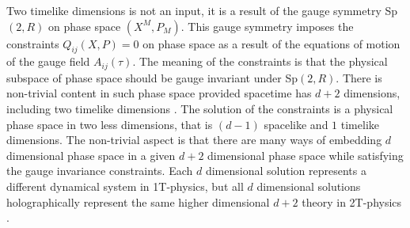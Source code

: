 \documentclass[a4paper,12pt]{article}
\begin{document}
Two timelike dimensions is not an input, it is a result of the
gauge symmetry Sp$(2,R)$ on phase space $\left( X^{M},P_{M}\right)
.$ This gauge symmetry imposes the constraints $Q_{ij}(X,P)=0$ on
phase space as a result of the equations of motion of the gauge
field $A_{ij}\left( \tau \right) $. The meaning of the constraints
is that the physical subspace of phase space should be gauge
invariant under Sp$\left( 2,R\right) .$ There is non-trivial
content in such phase space provided spacetime has $d+2$
dimensions, including two timelike dimensions \cite{old2T}. The
solution of the constraints is a physical phase space in two less
dimensions, that is $ \left( d-1\right) $ spacelike and $1$
timelike dimensions. The non-trivial aspect is that there are many
ways of embedding $d$ dimensional phase space in a given $d+2$
dimensional phase space while satisfying the gauge invariance
constraints. Each $d$ dimensional solution represents a different
dynamical system in 1T-physics, but all $d$ dimensional solutions
holographically represent the same higher dimensional $d+2$ theory
in 2T-physics \cite{old2T}.
\end{document}
